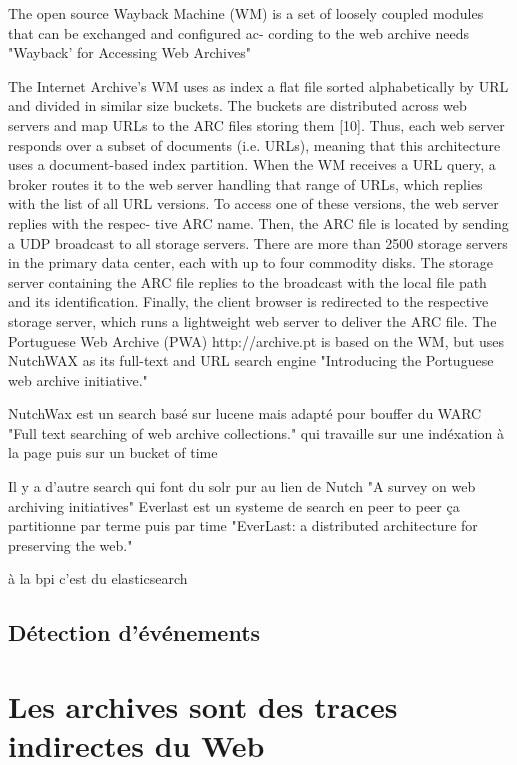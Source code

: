 \documentclass[symmetric,justified,marginals=raggedouter]{tufte-book}
\begin{document}
The open source Wayback Machine (WM) is a set of loosely
coupled modules that can be exchanged and configured ac-
cording  to  the  web  archive  needs  "Wayback’ for Accessing Web Archives"

The Internet Archive’s WM uses as index a flat file sorted
alphabetically by URL and divided in similar size buckets.
The  buckets  are  distributed  across  web  servers  and  map
URLs to the ARC files storing them [10].  Thus, each web
server  responds  over  a  subset  of  documents  (i.e.   URLs),
meaning that this architecture uses a document-based index
partition.   When the WM receives  a URL query,  a broker
routes  it  to  the  web  server  handling  that  range  of  URLs,
which  replies  with  the  list  of  all  URL  versions.   To  access
one of these versions, the web server replies with the respec-
tive ARC name.  Then, the ARC file is located by sending a
UDP broadcast to all storage servers.  There are more than
2500 storage servers in the primary data center, each with up
to four commodity disks.  The storage server containing the
ARC file replies to the broadcast with the local file path and
its identification.  Finally, the client browser is redirected to
the respective storage server, which runs a lightweight web
server to deliver the ARC file.
The  Portuguese  Web  Archive  (PWA)
http://archive.pt
is  based  on  the
WM, but uses NutchWAX as its full-text and URL search
engine "Introducing the Portuguese web archive initiative."

NutchWax est un search basé sur lucene mais adapté pour bouffer du WARC "Full text searching of web archive collections." qui travaille sur une indéxation à la page puis sur un bucket of time

Il y a d'autre search qui font du solr pur au lien de Nutch "A survey on web archiving initiatives"
Everlast est un systeme de search en peer to peer 
ça partitionne par terme puis par time "EverLast:  a distributed architecture for preserving the web."

à la bpi c'est du elasticsearch 


\subsection{Détection d'événements}

\section{Les archives sont des traces indirectes du Web}
\label{sec:4_legacy}
\end{document}
